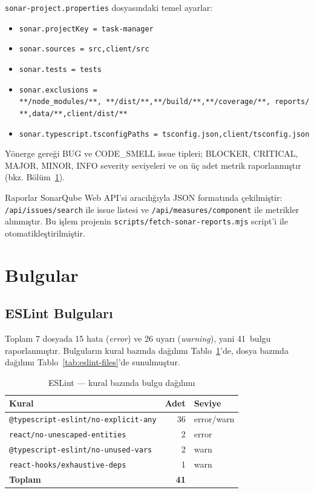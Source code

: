 \documentclass[conference]{IEEEtran}
\begin{document}
\texttt{sonar-project.properties} dosyasındaki temel ayarlar:
\begin{itemize}
\item \texttt{sonar.projectKey = task-manager}
\item \texttt{sonar.sources = src,client/src}
\item \texttt{sonar.tests = tests}
\item \texttt{sonar.exclusions = **/node\_modules/**,\
  **/dist/**,**/build/**,**/coverage/**,\
  reports/**,data/**,client/dist/**}
\item \texttt{sonar.typescript.tsconfigPaths =\
  tsconfig.json,client/tsconfig.json}
\end{itemize}

Yönerge gereği BUG ve CODE\_SMELL issue tipleri; BLOCKER, CRITICAL,
MAJOR, MINOR, INFO severity seviyeleri ve on üç adet metrik
raporlanmıştır (bkz. Bölüm~\ref{sec:bulgular}).

Raporlar SonarQube Web API'si aracılığıyla JSON formatında çekilmiştir:
\texttt{/api/issues/search} ile issue listesi ve
\texttt{/api/measures/component} ile metrikler alınmıştır. Bu işlem
projenin \texttt{scripts/fetch-sonar-reports.mjs} script'i ile
otomatikleştirilmiştir.

\section{Bulgular}
\label{sec:bulgular}

\subsection{ESLint Bulguları}

Toplam 7 dosyada 15 hata (\textit{error}) ve 26 uyarı (\textit{warning}),
yani 41~bulgu raporlanmıştır. Bulguların kural bazında dağılımı
Tablo~\ref{tab:eslint-rules-hit}'de, dosya bazında dağılımı
Tablo~\ref{tab:eslint-files}'de sunulmuştur.

\begin{table}[htbp]
\caption{ESLint — kural bazında bulgu dağılımı}
\label{tab:eslint-rules-hit}
\centering
\begin{tabular}{@{}lrl@{}}
\toprule
\textbf{Kural} & \textbf{Adet} & \textbf{Seviye} \\
\midrule
\texttt{@typescript-eslint/no-explicit-any} & 36 & error/warn \\
\texttt{react/no-unescaped-entities}        &  2 & error \\
\texttt{@typescript-eslint/no-unused-vars}  &  2 & warn \\
\texttt{react-hooks/exhaustive-deps}        &  1 & warn \\
\midrule
\textbf{Toplam} & \textbf{41} & \\
\bottomrule
\end{tabular}
\end{table}
\end{document}

